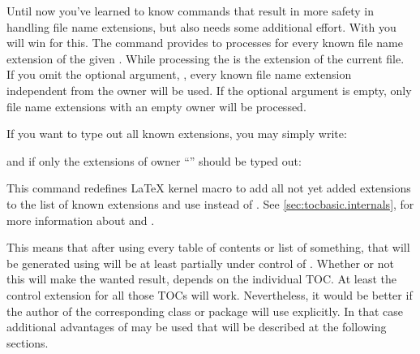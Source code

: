 \begin{Declaration}
\end{Declaration}
%
Until now you've learned to know commands that result in more safety in
handling file name extensions, but also needs some additional effort. With
 you will win for this. The command provides to
processes  for every known file name extension of the
given .  While processing the 
 is the extension of the current file.  If you omit the
optional argument, , every known file name extension
independent from the owner will be used. If the optional argument is empty,
only file name extensions with an empty owner will be processed.
\begin{Example}
  If you want to type out all known extensions, you may simply write:
\begin{lstcode}
  \doforeachtocfile{\typeout{\@currext}}
\end{lstcode}
  and if only the extensions of owner ``'' should be typed out:
\begin{lstcode}
  \doforeachtocfile[foo]{\typeout{\@currext}}
\end{lstcode}
\end{Example}
%

\begin{Declaration}
\end{Declaration}
%
This command redefines \LaTeX{} kernel macro  to add all not
yet added extensions to the list of known extensions and use
 instead of . See
\autoref{sec:tocbasic.internals},
 for more information about
 and .

This means that after using  every table of contents
or list of something, that will be generated using  will be
at least partially under control of . Whether or not this
will make the wanted result, depends on the individual TOC. At least the
 control extension for all those TOCs will work. Nevertheless,
it would be better if the author of the corresponding class or package will
use  explicitly. In that case additional advantages of
 may be used that will be described at the following
sections.%
%

